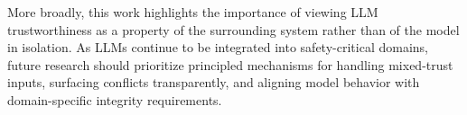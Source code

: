 \documentclass[letterpaper]{article}
\begin{document}
More broadly, this work highlights the importance of viewing LLM trustworthiness as a property of the surrounding system rather than of the model in isolation. As LLMs continue to be integrated into safety-critical domains, future research should prioritize principled mechanisms for handling mixed-trust inputs, surfacing conflicts transparently, and aligning model behavior with domain-specific integrity requirements.



\end{document}
